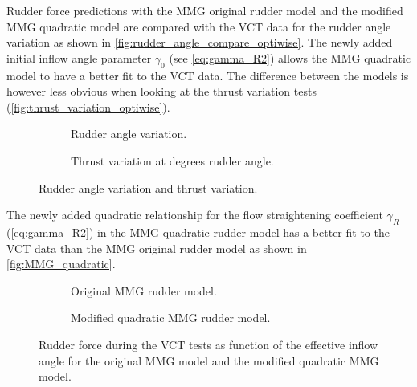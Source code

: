 Rudder force predictions with the MMG original rudder model and the modified MMG quadratic model are compared with the VCT data for the rudder angle variation as shown in \autoref{fig:rudder_angle_compare_optiwise}. The newly added initial inflow angle parameter $\gamma_0$ (see \autoref{eq:gamma_R2}) allows the MMG quadratic  model to have a better fit to the VCT data. The difference between the models is however less obvious when looking at the thrust variation tests (\autoref{fig:thrust_variation_optiwise}).
\begin{figure}[h]
     \centering
     \begin{subfigure}[b]{0.49\textwidth}
         \centering
         
        \caption{Rudder angle variation.}
        \label{fig:rudder_angle_compare_optiwise}
     \end{subfigure}
     \hfill
     \begin{subfigure}[b]{0.49\textwidth}
         \centering
         
        \caption{Thrust variation at  degrees rudder angle.}
        \label{fig:thrust_variation_optiwise}
     \end{subfigure}
    \caption{Rudder angle variation and thrust variation.}
    \label{fig:rudder_angle_compare_optiwise_all}
\end{figure}

The newly added quadratic relationship for the flow straightening coefficient $\gamma_R$ (\autoref{eq:gamma_R2}) in the MMG quadratic rudder model has a better fit to the VCT data than the MMG original rudder model as shown in \autoref{fig:MMG_quadratic}.
\begin{figure}[h]
     \centering
     \begin{subfigure}[b]{0.49\textwidth}
         \centering
         
        \caption{Original MMG rudder model.}
        \label{fig:Y_R_MMG_original}
     \end{subfigure}
     \hfill
     \begin{subfigure}[b]{0.49\textwidth}
         \centering
         
        \caption{Modified quadratic MMG rudder model.}
        \label{fig:Y_R_MMG_quadratic}
     \end{subfigure}
    \caption{Rudder force during the VCT tests as function of the effective inflow angle for the original MMG model and the modified quadratic MMG model.}
    \label{fig:MMG_quadratic}
\end{figure}

